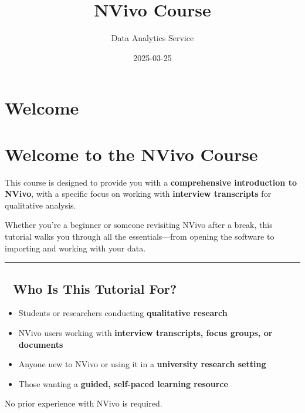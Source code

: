 \documentclass[
  letterpaper,
  DIV=11,
  numbers=noendperiod]{scrreprt}
\title{NVivo Course}
\author{Data Analytics Service}
\date{2025-03-25}
\providecommand{\tightlist}{%
  \setlength{\itemsep}{0pt}\setlength{\parskip}{0pt}}\usepackage{longtable,booktabs,array}
\renewcommand*\contentsname{Table of contents}
\newcommand\contentsname{Table of contents}
\begin{document}
\maketitle

\renewcommand*\contentsname{Table of contents}
{
\hypersetup{linkcolor=}
\setcounter{tocdepth}{2}
\tableofcontents
}


\chapter{Welcome}\label{welcome}


\chapter{Welcome to the NVivo Course}\label{welcome-to-the-nvivo-course}

This course is designed to provide you with a \textbf{comprehensive
introduction to NVivo}, with a specific focus on working with
\textbf{interview transcripts} for qualitative analysis.

Whether you're a beginner or someone revisiting NVivo after a break,
this tutorial walks you through all the essentials---from opening the
software to importing and working with your data.

\begin{center}\rule{0.5\linewidth}{0.5pt}\end{center}

\section{👥 Who Is This Tutorial For?}\label{who-is-this-tutorial-for}

\begin{itemize}
\tightlist
\item
  Students or researchers conducting \textbf{qualitative research}
\item
  NVivo users working with \textbf{interview transcripts, focus groups,
  or documents}
\item
  Anyone new to NVivo or using it in a \textbf{university research
  setting}
\item
  Those wanting a \textbf{guided, self-paced learning resource}
\end{itemize}

No prior experience with NVivo is required.
\end{document}
